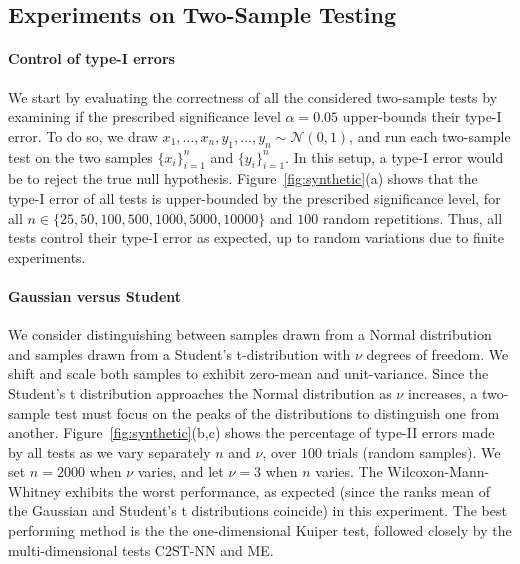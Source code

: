 \documentclass[a4paper]{article}
\begin{document}
  \subsection{Experiments on Two-Sample Testing}\label{sec:smallexps}

  \paragraph{Control of type-I errors} We start by evaluating the correctness of
  all the considered two-sample tests by examining if the prescribed
  significance level $\alpha = 0.05$ upper-bounds their type-I error. To do so,
  we draw $x_1, \ldots, x_n, y_1, \ldots, y_n \sim \mathcal{N}(0,1)$, and run
  each two-sample test on the two samples $\{x_i\}_{i=1}^n$ and
  $\{y_i\}_{i=1}^n$. In this setup, a type-I error would be to reject the true
  null hypothesis.  Figure~\ref{fig:synthetic}(a) shows that the type-I error
  of all tests is upper-bounded by the prescribed significance level, for all
  $n\in \{25,50,100,500,1000,5000,10000\}$ and $100$ random repetitions. Thus,
  all tests control their type-I error as expected, up to random variations due
  to finite experiments.

  \paragraph{Gaussian versus Student} We consider distinguishing between
  samples drawn from a Normal distribution and samples drawn from a Student's
  t-distribution with $\nu$ degrees of freedom.  We shift and scale both samples
  to exhibit zero-mean and unit-variance. Since the Student's t distribution
  approaches the Normal distribution as $\nu$ increases, a two-sample test must
  focus on the peaks of the distributions to
  distinguish one from another.  Figure~\ref{fig:synthetic}(b,c) shows the percentage of type-II errors 
  made by all tests as we vary separately $n$ and $\nu$, over $100$
  trials (random samples). We set $n = 2000$ when $\nu$ varies, and let $\nu =
  3$ when $n$ varies. The Wilcoxon-Mann-Whitney exhibits the worst performance,
  as expected (since the ranks mean of the Gaussian and Student's t
  distributions coincide) in this experiment. The best performing method is the
  the one-dimensional Kuiper test, followed closely by the multi-dimensional
  tests C2ST-NN and ME.
\end{document}
